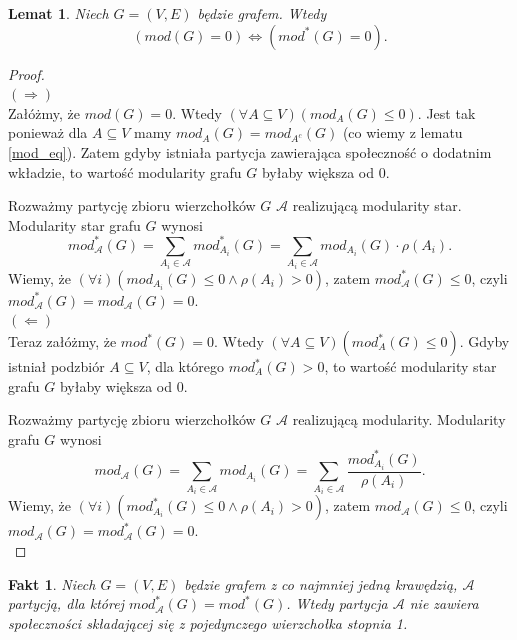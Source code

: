 \documentclass[letterpaper,12pt]{article}
\newtheorem{fact}{Fakt}
\newtheorem{lemma}{Lemat}
\begin{document}
\begin{lemma}
  \label{0mod}
  Niech \(G = (V,E)\) będzie grafem. Wtedy
  \[(mod(G) = 0) \Leftrightarrow (mod^*(G) = 0).\]
\end{lemma}

\begin{proof}
  \leavevmode\\
  \((\Rightarrow)\)\\
  Załóżmy, że \(mod(G) = 0\). Wtedy \((\forall A \subseteq V)(mod_A(G) \leq 0)\). Jest tak ponieważ dla \(A \subseteq V\) mamy \(mod_A(G) = mod_{A^c}(G)\) (co wiemy z lematu \ref{mod_eq}). Zatem gdyby istniała partycja zawierająca społeczność o dodatnim wkładzie, to wartość modularity grafu \(G\) byłaby większa od 0.

  Rozważmy partycję zbioru wierzchołków \(G\) \(\mathcal{A}\) realizującą modularity star. Modularity star grafu \(G\) wynosi
  \[mod_{\mathcal{A}}^*(G) = \sum_{A_i \in \mathcal{A}} mod_{A_i}^*(G) = \sum_{A_i \in \mathcal{A}} mod_{A_i}(G) \cdot \rho(A_i).\]
  Wiemy, że \((\forall i)(mod_{A_i}(G) \leq 0 \land \rho(A_i) > 0)\), zatem \(mod_{\mathcal{A}}^*(G) \leq 0\), czyli \(mod_{\mathcal{A}}^*(G) = mod_{\mathcal{A}}(G) = 0\).\\

  \noindent \((\Leftarrow)\)\\
  Teraz załóżmy, że \(mod^*(G) = 0\). Wtedy \((\forall A \subseteq V)(mod_A^*(G) \leq 0)\). Gdyby istniał podzbiór \(A \subseteq V\), dla którego \(mod_A^*(G) > 0\), to wartość modularity star grafu \(G\) byłaby większa od 0.

  Rozważmy partycję zbioru wierzchołków \(G\) \(\mathcal{A}\) realizującą modularity. Modularity grafu \(G\) wynosi
  \[mod_{\mathcal{A}}(G) = \sum_{A_i \in \mathcal{A}} mod_{A_i}(G) = \sum_{A_i \in \mathcal{A}} \frac{mod_{A_i}^*(G)}{\rho(A_i)}.\]
  Wiemy, że \((\forall i)(mod_{A_i}^*(G) \leq 0 \land \rho(A_i) > 0)\), zatem \(mod_{\mathcal{A}}(G) \leq 0\), czyli \(mod_{\mathcal{A}}(G) = mod_{\mathcal{A}}^*(G) = 0\).\\
\end{proof}

\begin{fact}
  Niech \(G = (V,E)\) będzie grafem z co najmniej jedną krawędzią, \(\mathcal{A}\) partycją, dla której \(mod_{\mathcal{A}}^*(G) = mod^*(G)\). Wtedy partycja \(\mathcal{A}\) nie zawiera społeczności składającej się z pojedynczego wierzchołka stopnia 1.
\end{fact}
\end{document}

